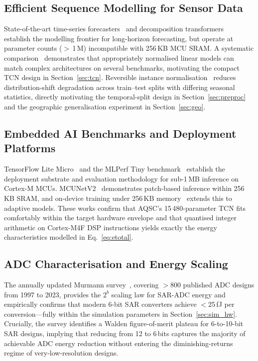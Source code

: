 \documentclass[12pt,a4paper]{article}
\begin{document}
\subsection{Efficient Sequence Modelling for Sensor Data}
\label{sec:rel_tcn}

State-of-the-art time-series forecasters~\cite{wu2023timesnet,nie2023patchtst}
and decomposition transformers~\cite{zhou2022fedformer,wu2021autoformer,zhou2021informer}
establish the modelling frontier for long-horizon forecasting, but
operate at parameter counts ($>$\,1\,M) incompatible with 256\,KB
MCU SRAM.
A systematic comparison~\cite{zeng2023linear} demonstrates that
appropriately normalised linear models can match complex architectures
on several benchmarks, motivating the compact TCN design in
Section~\ref{sec:tcn}.
Reversible instance normalisation~\cite{kim2022revin} reduces
distribution-shift degradation across train--test splits with differing
seasonal statistics, directly motivating the temporal-split design in
Section~\ref{sec:preproc} and the geographic generalisation experiment
in Section~\ref{sec:geo}.

\subsection{Embedded AI Benchmarks and Deployment Platforms}
\label{sec:rel_hw}

TensorFlow Lite Micro~\cite{david2021tflitemicro} and the MLPerf Tiny
benchmark~\cite{banbury2021mlperf} establish the deployment substrate
and evaluation methodology for sub-1\,MB inference on Cortex-M MCUs.
MCUNetV2~\cite{lin2021mcunetv2} demonstrates patch-based inference
within 256\,KB SRAM, and on-device training under 256\,KB
memory~\cite{lin2022ondevice} extends this to adaptive models.
These works confirm that AQSC's 15\,480-parameter TCN fits
comfortably within the target hardware envelope and that quantised
integer arithmetic on Cortex-M4F DSP instructions yields exactly the
energy characteristics modelled in Eq.~\eqref{eq:etotal}.

\subsection{ADC Characterisation and Energy Scaling}
\label{sec:rel_adc}

The annually updated Murmann survey~\cite{murmann2023adc}, covering
$>$800 published ADC designs from 1997 to 2023, provides the $2^b$
scaling law for SAR-ADC energy and empirically confirms that modern
6-bit SAR converters achieve $<$25\,fJ per conversion---fully within
the simulation parameters in Section~\ref{sec:sim_hw}.
Crucially, the survey identifies a Walden figure-of-merit plateau for
6-to-10-bit SAR designs, implying that reducing from 12 to 6\,bits
captures the majority of achievable ADC energy reduction without
entering the diminishing-returns regime of very-low-resolution designs.
\end{document}
